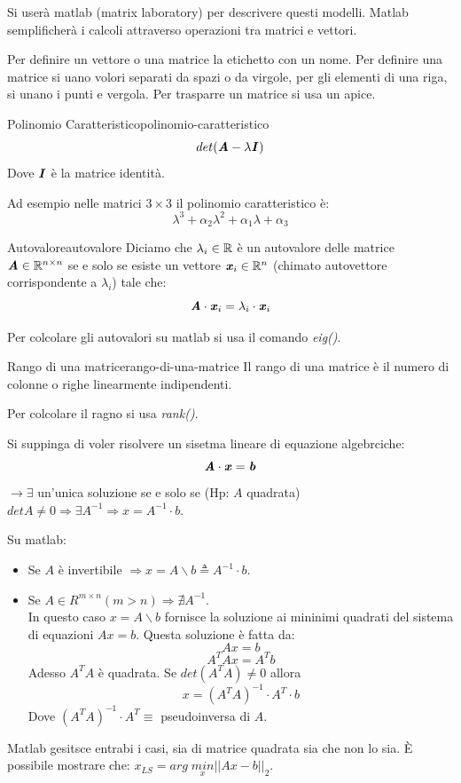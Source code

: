 \documentclass[12pt]{article}
\begin{document}
Si user\`a  matlab (matrix laboratory) per descrivere questi modelli. Matlab semplificher\`a i calcoli attraverso operazioni tra matrici e vettori.

Per definire un vettore o una matrice la etichetto con un nome. Per definire una matrice si uano volori separati da spazi o da virgole, per gli elementi di una riga, si unano i punti e vergola. Per trasparre un matrice si usa un apice.

\begin{definition}{Polinomio Caratteristico}{polinomio-caratteristico}
    \[ det(\textbf{\textit{A}}-\lambda \textbf{\textit{I}}) \]
    Dove $\textbf{\textit{I}}$ \`e la matrice identit\`a.
\end{definition}
Ad esempio nelle matrici $3\times 3$ il polinomio caratteristico \`e:
\[ \lambda^3 + \alpha_2\lambda^2 + \alpha_1\lambda + \alpha_3 \]
\begin{definition}{Autovalore}{autovalore}
    Diciamo che $\lambda_i \in \mathbb{R}$ \`e un autovalore delle matrice $\textbf{\textit{A}} \in \mathbb{R}^{n\times n}$ se e solo se esiste un vettore $\textbf{\textit{x}}_i \in \mathbb{R}^n$ (chimato autovettore corrispondente a $\lambda_i$) tale che:
    \[ \textbf{\textit{A}}\cdot  \textbf{\textit{x}}_i = \lambda_i \cdot \textbf{\textit{x}}_i \]
\end{definition}

Per colcolare gli autovalori su matlab si usa il comando \emph{eig()}.

\begin{definition}{Rango di una matrice}{rango-di-una-matrice}
    Il rango di una matrice \`e il numero di colonne o righe linearmente indipendenti.
\end{definition}
Per colcolare il ragno si usa \emph{rank()}.

Si suppinga di voler risolvere un sisetma lineare di equazione algebrciche:
\[ \textbf{\textit{A}}\cdot \textbf{\textit{x}} = \textbf{\textit{b}} \]
$\to \exists$ un'unica soluzione se e solo se (Hp: $A$ quadrata) $detA \neq 0 \Rightarrow \exists A^{-1} \Rightarrow \boxed{x = A^{-1}\cdot b}$.

Su matlab:
\begin{itemize}
    \item Se $A$ \`e invertibile $\Rightarrow \boxed{x = A\backslash b\triangleq A^{-1}\cdot b}$.
    \item Se $A \in R^{m\times n} (m > n) \Rightarrow \nexists A^{-1}$. \\
        In questo caso $x=A\backslash b$ fornisce la soluzione ai mininimi quadrati del sistema di equazioni $Ax =b$. Questa soluzione \`e fatta da:
        \[ Ax = b \]
        \[A^TAx = A^Tb \]
        Adesso $A^TA$ \`e quadrata. Se $det(A^TA) \neq 0$ allora
        \[ \boxed{x = (A^TA)^{-1}\cdot A^T\cdot b} \]
        Dove $(A^TA)^{-1}\cdot A^T \equiv$ pseudoinversa di $A$.
\end{itemize}
Matlab gesitsce entrabi i casi, sia di matrice quadrata sia che non lo sia. \`E possibile mostrare che: $x_{LS} = arg\;\underset{x}{min}|| Ax-b ||_2 $.
\end{document}
